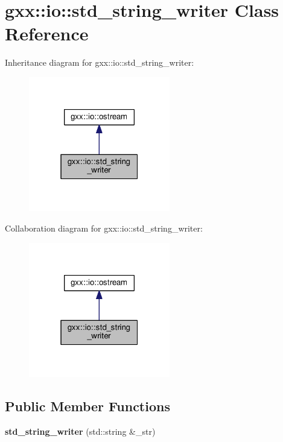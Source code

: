 \hypertarget{classgxx_1_1io_1_1std__string__writer}{}\section{gxx\+:\+:io\+:\+:std\+\_\+string\+\_\+writer Class Reference}
\label{classgxx_1_1io_1_1std__string__writer}


Inheritance diagram for gxx\+:\+:io\+:\+:std\+\_\+string\+\_\+writer\+:
\nopagebreak
\begin{figure}[H]
\begin{center}
\leavevmode
\includegraphics[width=175pt]{classgxx_1_1io_1_1std__string__writer__inherit__graph}
\end{center}
\end{figure}


Collaboration diagram for gxx\+:\+:io\+:\+:std\+\_\+string\+\_\+writer\+:
\nopagebreak
\begin{figure}[H]
\begin{center}
\leavevmode
\includegraphics[width=175pt]{classgxx_1_1io_1_1std__string__writer__coll__graph}
\end{center}
\end{figure}
\subsection*{Public Member Functions}
\begin{DoxyCompactItemize}
\item 
{\bfseries std\+\_\+string\+\_\+writer} (std\+::string \&\+\_\+str)\hypertarget{classgxx_1_1io_1_1std__string__writer_a59c75c37207497f6471b10e4d4d47dbb}{}\label{classgxx_1_1io_1_1std__string__writer_a59c75c37207497f6471b10e4d4d47dbb}

\end{DoxyCompactItemize}
